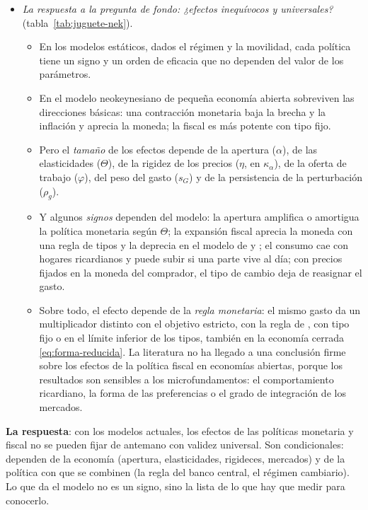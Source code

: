 \documentclass[11pt]{article}
\begin{document}
\begin{itemize}
\item \emph{La respuesta a la pregunta de fondo: ¿efectos inequívocos y universales?} (tabla~\ref{tab:juguete-nek}).
  \begin{itemize}
  \item En los modelos estáticos, dados el régimen y la movilidad, cada política tiene un signo y un orden de eficacia que no dependen del valor de los parámetros.
  \item En el modelo neokeynesiano de pequeña economía abierta sobreviven las direcciones básicas: una contracción monetaria baja la brecha y la inflación y aprecia la moneda; la fiscal es más potente con tipo fijo.
  \item Pero el \emph{tamaño} de los efectos depende de la apertura ($\alpha$), de las elasticidades ($\Theta$), de la rigidez de los precios ($\eta$, en $\kappa_\alpha$), de la oferta de trabajo ($\varphi$), del peso del gasto ($s_G$) y de la persistencia de la perturbación ($\rho_g$).
  \item Y algunos \emph{signos} dependen del modelo: la apertura amplifica o amortigua la política monetaria según $\Theta$; la expansión fiscal aprecia la moneda con una regla de tipos y la deprecia en el modelo de  y ; el consumo cae con hogares ricardianos y puede subir si una parte vive al día\nocite{GaliLopezSalidoValles2007}; con precios fijados en la moneda del comprador, el tipo de cambio deja de reasignar el gasto.
  \item Sobre todo, el efecto depende de la \emph{regla monetaria}: el mismo gasto da un multiplicador distinto con el objetivo estricto, con la regla de , con tipo fijo o en el límite inferior de los tipos, también en la economía cerrada \eqref{eq:forma-reducida}. La literatura no ha llegado a una conclusión firme sobre los efectos de la política fiscal en economías abiertas, porque los resultados son sensibles a los microfundamentos: el comportamiento ricardiano, la forma de las preferencias o el grado de integración de los mercados\nocite{ZeynelogluKoenig2016}.
  \end{itemize}
\end{itemize}

\begin{ideaclave}
\textbf{La respuesta}: con los modelos actuales, los efectos de las políticas monetaria y fiscal no se pueden fijar de antemano con validez universal. Son condicionales: dependen de la economía (apertura, elasticidades, rigideces, mercados) y de la política con que se combinen (la regla del banco central, el régimen cambiario). Lo que da el modelo no es un signo, sino la lista de lo que hay que medir para conocerlo.
\end{ideaclave}
\end{document}
